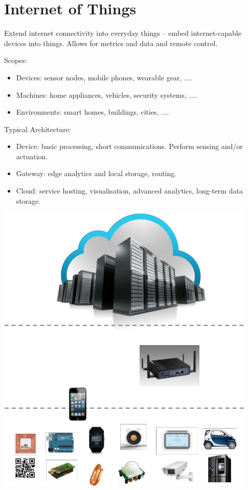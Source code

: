\documentclass[a4paper, 11pt]{article}
\begin{document}
\section*{Internet of Things}
{
    \begin{minipage}[t]{0.65\textwidth}
    \setlength{\parskip}{8pt}
    Extend internet connectivity into everyday things -- embed internet-capable devices into things. Allows for metrics and data and remote control.

    Scopes:
    \begin{itemize}
    \item Devices: sensor nodes, mobile phones, wearable gear, ....
    \item Machines: home appliances, vehicles, security systems, ....
    \item Environments: smart homes, buildings, cities, ....
    \end{itemize}

    Typical Architecture:
    \begin{itemize}
    \item Device: basic processing, short communications. Perform sensing and/or actuation.
    \item Gateway: edge analytics and local storage, routing.
    \item Cloud: service hosting, visualisation, advanced analytics, long-term data storage.
    \end{itemize}
    \end{minipage}
    \hspace{3mm}
    \begin{minipage}[t]{0.3\textwidth}
    \vspace{0pt}
    \centering
    \includegraphics[width=\textwidth]{iot.png}
    \end{minipage}
}
\end{document}
